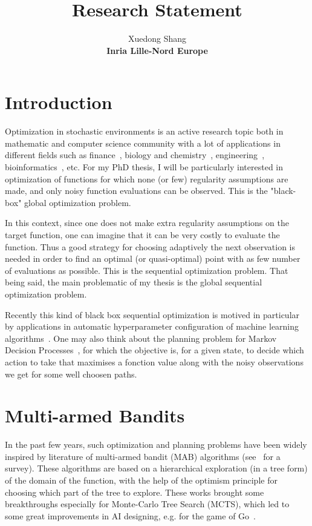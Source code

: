 \documentclass[12pt]{article}
\theoremstyle{plain} \numberwithin{equation}{section}
\theoremstyle{definition}
\begin{document}
\title{Research Statement}
\author{Xuedong Shang\\ \large  \textbf{Inria Lille-Nord Europe}}
\maketitle

\section{Introduction}

Optimization in stochastic environments is an active research topic both in mathematic and computer science community with a lot of applications in different fields such as finance~\cite{ziemba2006}, biology and chemistry~\cite{floudas2000}, engineering~\cite{wang2007}, bioinformatics~\cite{moles2003}, etc. For my PhD thesis, I will be particularly interested in optimization of functions for which none (or few) regularity assumptions are made, and only noisy function evaluations can be observed. This is the "black-box" global optimization problem.

In this context, since one does not make extra regularity assumptions on the target function, one can imagine that it can be very costly to evaluate the function. Thus a good strategy for choosing adaptively the next observation is needed in order to find an optimal (or quasi-optimal) point with as few number of evaluations as possible. This is the sequential optimization problem. That being said, the main problematic of my thesis is the global sequential optimization problem.

Recently this kind of black box sequential optimization is motived in particular by applications in automatic hyperparameter configuration of machine learning algorithms~\cite{hoffman2014}. One may also think about the planning problem for Markov Decision Processes~\cite{puterman1994}, for which the objective is, for a given state, to decide which action to take that maximises a fonction value along with the noisy observations we get for some well choosen paths.

\section{Multi-armed Bandits}

In the past few years, such optimization and planning problems have been widely inspired by literature of multi-armed bandit (MAB) algorithms (see~\cite{munos2014} for a survey). These algorithms are based on a hierarchical exploration (in a tree form) of the domain of the function, with the help of the optimism principle for choosing which part of the tree to explore. These works brought some breakthroughs especially for Monte-Carlo Tree Search (MCTS), which led to some great improvements in AI designing, e.g. for the game of Go~\cite{silver2016}.
\end{document}
